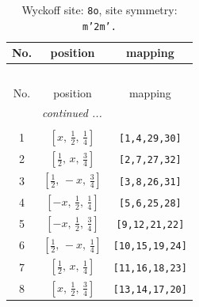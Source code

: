 \documentclass[fleqn,8pt]{jsarticle}
\begin{document}
\begin{longtable}{ccc}
\caption{Wyckoff site: {\tt 8o}, site symmetry: {\tt m'2m'.}}
 \\
 \hline \hline
No. & position & mapping \\ \hline \endfirsthead

\multicolumn{2}{l}{\tablename\ \thetable{}} \\
 \hline \hline
No. & position & mapping \\ \hline \endhead

 \hline \hline
\multicolumn{2}{r}{\footnotesize\it continued ...} \\ \endfoot

 \hline \hline
\multicolumn{2}{r}{} \\ \endlastfoot

1 & $\left[ x,\, \frac{1}{2},\, \frac{1}{4} \right]$ & {\tt [1,4,29,30]} \\ \hline
2 & $\left[ \frac{1}{2},\, x,\, \frac{3}{4} \right]$ & {\tt [2,7,27,32]} \\ \hline
3 & $\left[ \frac{1}{2},\, - x,\, \frac{3}{4} \right]$ & {\tt [3,8,26,31]} \\ \hline
4 & $\left[ - x,\, \frac{1}{2},\, \frac{1}{4} \right]$ & {\tt [5,6,25,28]} \\ \hline
5 & $\left[ - x,\, \frac{1}{2},\, \frac{3}{4} \right]$ & {\tt [9,12,21,22]} \\ \hline
6 & $\left[ \frac{1}{2},\, - x,\, \frac{1}{4} \right]$ & {\tt [10,15,19,24]} \\ \hline
7 & $\left[ \frac{1}{2},\, x,\, \frac{1}{4} \right]$ & {\tt [11,16,18,23]} \\ \hline
8 & $\left[ x,\, \frac{1}{2},\, \frac{3}{4} \right]$ & {\tt [13,14,17,20]} \\
\end{longtable}
\renewcommand{\arraystretch}{1.2}
\end{document}
